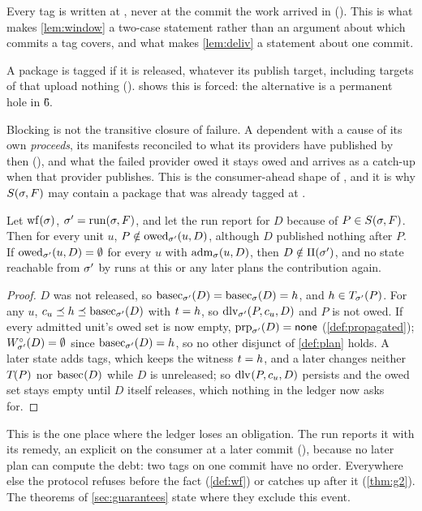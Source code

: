 Every tag is written at \Head{}, never at the commit the work arrived in
(). This is what makes \cref{lem:window} a two-case statement rather
than an argument about which commits a tag covers, and what makes
\cref{lem:deliv} a statement about one commit.

A package is tagged if it is released, whatever its publish target, including
targets of  that upload nothing (). 
shows this is forced: the alternative is a permanent hole in \G{6}.

Blocking is not the transitive closure of failure. A dependent with a cause of
its own \emph{proceeds}, its manifests reconciled to what its providers have
published by then (), and what the failed provider owed it stays
owed and arrives as a catch-up when that provider publishes. This is the
consumer-ahead shape of , and it is why $S(\sigma,F)$ may
contain a package that was already tagged at \Head{}.

\begin{proposition}
\label{prop:loss}
Let $\mathrm{wf}(\sigma)$, $\sigma' = \mathrm{run}(\sigma,F)$, and let the run report  for
$D$ because of $P \in S(\sigma,F)$. Then for every unit $u$,
$P \notin \mathrm{owed}_{\sigma'}(u,D)$, although $D$ published nothing after $P$. If
$\mathrm{owed}_{\sigma'}(u,D) = \emptyset$ for every $u$ with $\mathrm{adm}_{\sigma}(u,D)$, then $D
\notin \Pi(\sigma')$, and no state reachable from $\sigma'$ by runs at this or any
later \Head{} plans the contribution again.
\end{proposition}

\begin{proof}
$D$ was not released, so $\mathrm{basec}_{\sigma'}(D) = \mathrm{basec}_{\sigma}(D) = h$, and
$h \in T_{\sigma'}(P)$. For any $u$, $c_{u} \preceq h \preceq
\mathrm{basec}_{\sigma'}(D)$ with $t = h$, so $\mathrm{dlv}_{\sigma'}(P,c_{u},D)$ and $P$ is
not owed. If every admitted unit's owed set is now empty, $\mathrm{prp}_{\sigma'}(D) =
\mathsf{none}$ (\cref{def:propagated}); $W^{\circ}_{\sigma'}(D) = \emptyset$ since
$\mathrm{basec}_{\sigma'}(D) = h$, so no other disjunct of \cref{def:plan} holds. A
later state adds tags, which keeps the witness $t = h$, and a later
\Head{} changes neither $T_{}(P)$ nor $\mathrm{basec}_{}(D)$ while $D$ is
unreleased; so $\mathrm{dlv}_{}(P,c_{u},D)$ persists and the owed set stays empty
until $D$ itself releases, which nothing in the ledger now asks for.
\end{proof}

This is the one place where the ledger loses an obligation. The run reports
it with its remedy, an explicit  on the consumer at a later
commit (), because no later plan can compute the debt: two tags on
one commit have no order. Everywhere else the protocol refuses before the fact
(\cref{def:wf}) or catches up after it (\cref{thm:g2}). The theorems of
\cref{sec:guarantees} state where they exclude this event.


